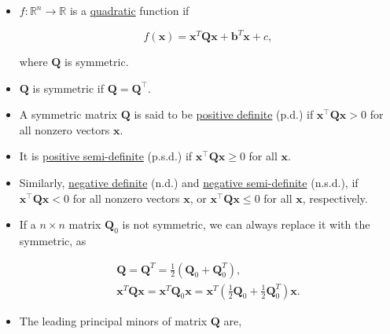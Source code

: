 \begin{itemize}
	\item \(f: \mathbb{R}^{n} \rightarrow \mathbb{R}\) is a \underline{quadratic} function if

	\begin{equation*}
		f(\boldsymbol{x})=\boldsymbol{x}^{T} \boldsymbol{Q} \boldsymbol{x}+\boldsymbol{b}^{T} \boldsymbol{x}+c,
	\end{equation*}
	
	where \(\boldsymbol{Q}\) is {\color{black}symmetric}.

	\item \(\boldsymbol{Q}\) is symmetric if \(\boldsymbol{Q}=\boldsymbol{Q}^{\top}\).
	
	\item A symmetric matrix \(\boldsymbol{Q}\) is said to be \underline{positive definite} (p.d.) if \(\boldsymbol{x}^{\top} \boldsymbol{Q} \boldsymbol{x}>0\) for {\color{black}all nonzero} vectors \(\boldsymbol{x}\).
	
	\item It is \underline{positive semi-definite} (p.s.d.) if \(\boldsymbol{x}^{\top} \boldsymbol{Q} \boldsymbol{x} \geq 0\) for {\color{black}all} \(\boldsymbol{x}\).
	
	\item Similarly, \underline{negative definite} (n.d.) and \underline{negative semi-definite} (n.s.d.),  if \(\boldsymbol{x}^{\top} \boldsymbol{Q} \boldsymbol{x}<0\) for {\color{black}all nonzero} vectors \(\boldsymbol{x}\), or \(\boldsymbol{x}^{\top} \boldsymbol{Q} \boldsymbol{x} \leq 0\) for {\color{black}all} \(\boldsymbol{x}\), respectively.
	
	\item If a  \(n \times n\) matrix \(\boldsymbol{Q}_{0}\) is not symmetric, we can always replace it with the symmetric, as

	\begin{equation*}
		\begin{gathered}
			\boldsymbol{Q}=\boldsymbol{Q}^{T}=\frac{1}{2}\left(\boldsymbol{Q}_{0}+\boldsymbol{Q}_{0}^{T}\right), \\
			\boldsymbol{x}^{T} \boldsymbol{Q} \boldsymbol{x}=\boldsymbol{x}^{T} \boldsymbol{Q}_{0} \boldsymbol{x}=\boldsymbol{x}^{T}\left(\frac{1}{2} \boldsymbol{Q}_{0}+\frac{1}{2} \boldsymbol{Q}_{0}^{T}\right) \boldsymbol{x}.
		\end{gathered}
	\end{equation*}
	
	\item The leading principal minors of matrix \(\boldsymbol{Q}\) are,
	

\end{itemize}
